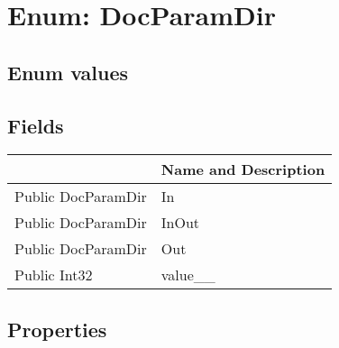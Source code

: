 \documentclass[11pt, oneside, a4paper]{book}
\begin{document}
\section{Enum: DocParamDir}

\subsection{Enum values}

\subsection{Fields}
\begin{center}
\begin{tabular}{| p{3cm} | p{12cm} | }
\hline
\textbf{ } & \textbf{ Name and Description}\\
\hline
 Public  DocParamDir &  In\hypertarget{SoftwareEngineeringTools.{}Documentation.{}DocParamDir.{}In}{}\\
\hline
 Public  DocParamDir &  InOut\hypertarget{SoftwareEngineeringTools.{}Documentation.{}DocParamDir.{}InOut}{}\\
\hline
 Public  DocParamDir &  Out\hypertarget{SoftwareEngineeringTools.{}Documentation.{}DocParamDir.{}Out}{}\\
\hline
 Public  Int32 &  value\_\_\hypertarget{SoftwareEngineeringTools.{}Documentation.{}DocParamDir.{}value\_\_}{}\\
\hline
\end{tabular}
\end{center}

\subsection{Properties}
\end{document}

